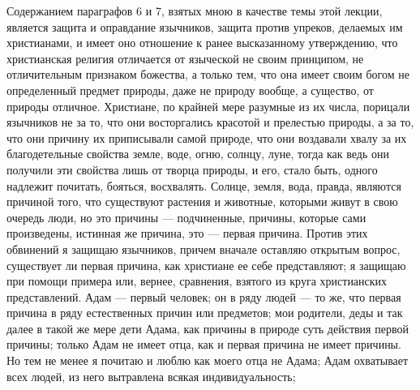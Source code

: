 \documentclass[12pt]{article}
\begin{document}
Содержанием параграфов 6 и 7, взятых мною в качестве темы этой лекции, является защита и оправдание язычников, защита против упреков, делаемых им христианами, и имеет оно отношение к ранее высказанному утверждению, что христианская религия отличается от языческой не своим принципом, не отличительным признаком божества, а только тем, что она имеет своим богом не определенный предмет природы, даже не природу вообще, а существо, от природы отличное. Христиане, по крайней мере разумные из их числа, порицали язычников не за то, что они восторгались красотой и прелестью природы, а за то, что они причину их приписывали самой природе, что они воздавали хвалу за их благодетельные свойства земле, воде, огню, солнцу, луне, тогда как ведь они получили эти свойства лишь от творца природы, и его, стало быть, одного надлежит почитать, бояться, восхвалять. Солнце, земля, вода, правда, являются причиной того, что существуют растения и животные, которыми живут в свою очередь люди, но это причины --- подчиненные, причины, которые сами произведены, истинная же причина, это --- первая причина. Против этих обвинений я защищаю язычников, причем вначале оставляю открытым вопрос, существует ли первая причина, как христиане ее себе представляют; я защищаю при помощи примера или, вернее, сравнения, взятого из круга христианских представлений. Адам --- первый человек; он в ряду людей --- то же, что первая причина в ряду естественных причин или предметов; мои родители, деды и так далее в такой же мере дети Адама, как причины в природе суть действия первой причины; только Адам не имеет отца, как и первая причина не имеет причины. Но тем не менее я почитаю и люблю как моего отца не Адама; Адам охватывает всех людей, из него вытравлена всякая индивидуальность; 
\end{document}
